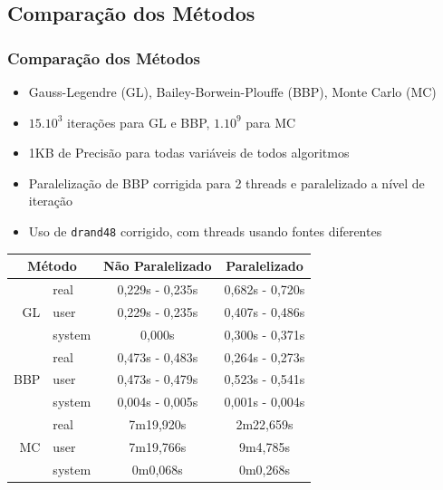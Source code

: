 \documentclass{beamer}
\begin{document}
\begin{frame}

\subsection{Comparação dos Métodos}
\frametitle{Comparação dos Métodos}

\scriptsize
\begin{itemize}
    \item Gauss-Legendre (GL), Bailey-Borwein-Plouffe (BBP), Monte Carlo (MC)
    \item $15.10^3$ iterações para GL e BBP, $1.10^9$ para MC
    \item 1KB de Precisão para todas variáveis de todos algoritmos
    \item Paralelização de BBP corrigida para 2 threads e paralelizado a nível de iteração
    \item Uso de \texttt{drand48} corrigido, com threads usando fontes diferentes
\end{itemize}

\renewcommand*{\arraystretch}{1.3}
\begin{table}[h]
	\centering
	\begin{tabular}{|r|l|c|c|}
		\hline
		\multicolumn{2}{|c|}{Método}	& Não Paralelizado & Paralelizado \\
		\hline
		\multirow{3}{*}{GL} & real 		& 0,229s - 0,235s	& 0,682s - 0,720s \\
							& user 		& 0,229s - 0,235s	& 0,407s - 0,486s \\
							& system	& 0,000s			& 0,300s - 0,371s \\
		\hline
		\multirow{3}{*}{BBP} & real 	& 0,473s - 0,483s	& 0,264s - 0,273s \\
							& user 		& 0,473s - 0,479s	& 0,523s - 0,541s \\
							& system 	& 0,004s - 0,005s	& 0,001s - 0,004s \\
		\hline
		\multirow{3}{*}{MC} & real 		& 7m19,920s	& 2m22,659s \\
							& user 		& 7m19,766s	& 9m4,785s \\
							& system	& 0m0,068s	& 0m0,268s \\
		\hline
	\end{tabular}
\end{table}
\renewcommand*{\arraystretch}{1}
\normalsize

\end{frame}

\end{document}
